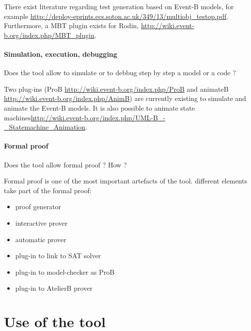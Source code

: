 \begin{assessor2}
  There exist literature regarding test generation based on Event-B
  models, for example
  \url{http://deploy-eprints.ecs.soton.ac.uk/349/13/multiobj_testop.pdf}. Furthermore,
  a MBT plugin exists for Rodin,
  \url{http://wiki.event-b.org/index.php/MBT_plugin}.
\end{assessor2}

\paragraph{Simulation, execution, debugging}
Does the tool allow to simulate or to debbug step by step a model or a code ?

\begin{author_comment}

Two plug-ins (ProB \url{http://wiki.event-b.org/index.php/ProB} and animateB \url{http://wiki.event-b.org/index.php/AnimB}) are currently existing to simulate and animate the Event-B models. It is also possible to animate state machines\url{http://wiki.event-b.org/index.php/UML-B_-_Statemachine_Animation}.
\end{author_comment}

\paragraph{Formal proof}
Does the tool allow formal proof ?  How ?

\begin{author_comment}

Formal proof is one of the most important artefacts of the tool. different elements take part of the formal proof:
\begin{itemize}
\item proof generator
\item interactive prover
\item automatic prover
\item plug-in to link to SAT solver
\item plug-in to model-checker as ProB
\item plug-in to AtelierB prover
\end{itemize}
\end{author_comment}


\section{Use of the tool}


